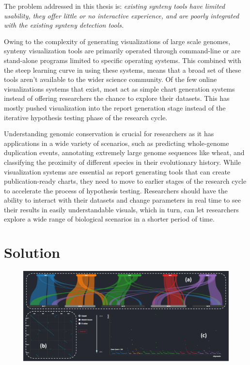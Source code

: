 The problem addressed in this thesis is: \textit{existing synteny tools have limited usability, they offer little or no interactive experience, and are poorly integrated with the existing synteny detection tools.}

Owing to the complexity of generating visualizations of large scale genomes, synteny visualization tools are primarily operated through command-line or are stand-alone programs limited to specific operating systems. This combined with the steep learning curve in using these systems, means that a broad set of these tools aren't available to the wider science community. Of the few online visualizations systems that exist, most act as simple chart generation systems instead of offering researchers the chance to explore their datasets. This has mostly pushed visualization into the report generation stage instead of the  iterative hypothesis testing phase of the research cycle.

Understanding genomic conservation is crucial for researchers as it has applications in a wide variety of scenarios, such as predicting whole-genome duplication events, annotating extremely large genome sequences like wheat, and classifying the proximity of different species in their evolutionary history. 
While visualization systems are essential as report generating tools that can create publication-ready charts, they need to move to earlier stages of the research cycle to accelerate the process of hypothesis testing.
Researchers should have the ability to interact with their datasets and change parameters in real time to see their results in easily understandable visuals,
which in turn, can let researchers explore a wide range of biological scenarios in a shorter period of time.

\section{Solution}

\begin{figure}
  \centering
  \includegraphics[width=1\linewidth]{images/ch_1_dashboard.PNG}
  \label{fig:ch_1_dashboard}
\end{figure}

